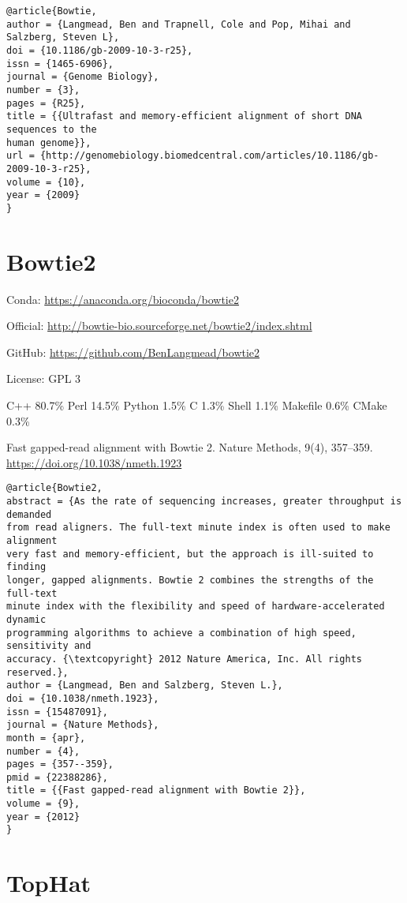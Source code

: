 \documentclass[]{article}
\begin{document}
\begin{verbatim}
@article{Bowtie,
author = {Langmead, Ben and Trapnell, Cole and Pop, Mihai and Salzberg, Steven L},
doi = {10.1186/gb-2009-10-3-r25},
issn = {1465-6906},
journal = {Genome Biology},
number = {3},
pages = {R25},
title = {{Ultrafast and memory-efficient alignment of short DNA sequences to the
human genome}},
url = {http://genomebiology.biomedcentral.com/articles/10.1186/gb-2009-10-3-r25},
volume = {10},
year = {2009}
}
\end{verbatim}

\section{Bowtie2}

Conda: \url{https://anaconda.org/bioconda/bowtie2}

Official: \url{http://bowtie-bio.sourceforge.net/bowtie2/index.shtml}

GitHub: \url{https://github.com/BenLangmead/bowtie2}

License: GPL 3

C++ 80.7\% Perl 14.5\% Python 1.5\% C 1.3\% Shell 1.1\% Makefile 0.6\% CMake 0.3\%



Fast gapped-read alignment with Bowtie 2. Nature Methods, 9(4), 357–359. \url{https://doi.org/10.1038/nmeth.1923}

\begin{verbatim}
@article{Bowtie2,
abstract = {As the rate of sequencing increases, greater throughput is demanded
from read aligners. The full-text minute index is often used to make alignment
very fast and memory-efficient, but the approach is ill-suited to finding
longer, gapped alignments. Bowtie 2 combines the strengths of the full-text
minute index with the flexibility and speed of hardware-accelerated dynamic
programming algorithms to achieve a combination of high speed, sensitivity and
accuracy. {\textcopyright} 2012 Nature America, Inc. All rights reserved.},
author = {Langmead, Ben and Salzberg, Steven L.},
doi = {10.1038/nmeth.1923},
issn = {15487091},
journal = {Nature Methods},
month = {apr},
number = {4},
pages = {357--359},
pmid = {22388286},
title = {{Fast gapped-read alignment with Bowtie 2}},
volume = {9},
year = {2012}
}
\end{verbatim}

\section{TopHat}
\end{document}
